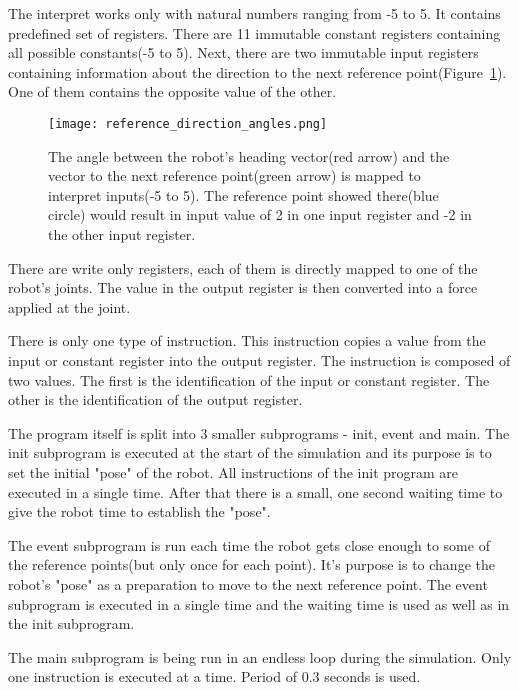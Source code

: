 \documentclass{ExcelAtFIT}
\begin{document}
The interpret works only with natural numbers ranging from -5 to 5.
It contains predefined set of registers.
There are 11 immutable constant registers containing all possible constants(-5 to 5).
Next, there are two immutable input registers containing information about the direction to the next reference point(Figure~\ref{fig:ReferenceDirection}).
One of them contains the opposite value of the other.

\begin{figure}[t]
	\centering
	{\texttt{[image: reference\_direction\_angles.png]}}
	\caption{
		The angle between the robot's heading vector(red arrow) and the vector to the next reference point(green arrow) is mapped to interpret inputs(-5 to 5).
		The reference point showed there(blue circle) would result in input value of 2 in one input register and -2 in the other input register.
	}
	\label{fig:ReferenceDirection}
\end{figure}

There are write only registers, each of them is directly mapped to one of the robot's joints.
The value in the output register is then converted into a force applied at the joint.

There is only one type of instruction.
This instruction copies a value from the input or constant register into the output register.
The instruction is composed of two values.
The first is the identification of the input or constant register.
The other is the identification of the output register.

The program itself is split into 3 smaller subprograms - init, event and main.
The init subprogram is executed at the start of the simulation and its purpose is to set the initial "pose" of the robot.
All instructions of the init program are executed in a single time.
After that there is a small, one second waiting time to give the robot time to establish the "pose".

The event subprogram is run each time the robot gets close enough to some of the reference points(but only once for each point).
It's purpose is to change the robot's "pose" as a preparation to move to the next reference point.
The event subprogram is executed in a single time and the waiting time is used as well as in the init subprogram.

The main subprogram is being run in an endless loop during the simulation.
Only one instruction is executed at a time.
Period of 0.3 seconds is used.


\end{document}
